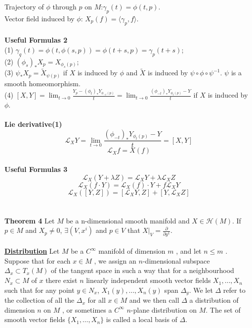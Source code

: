 \documentclass{article}
\begin{document}
Trajectory of $\phi$ through $p$ on $M$:$\gamma_p(t) = \phi(t,p)$.\\
Vector field induced by $\phi$: $X_p(f) = \langle \gamma_p , f \rangle$.\\ \\
\textbf{Useful Formulas 2}\\
(1) $\gamma_q(t) = \phi(t,\phi(s,p)) = \phi(t+s,p) = \gamma_p(t+s)$;\\
(2) $(\phi_s)_{*}X_p = X_{\phi_s(p)}$;\\
(3) $\psi_{*} X_p = \tilde{X}_{\psi(p)}$ if $X$ is induced by $\phi$ and $\tilde{X}$ is induced by $\psi \circ \phi \circ \psi^{-1} $. $\psi$ is a smooth  homeomorphism.\\
(4) $[X,Y] = \lim_{t \to 0} \frac{Y_p-(\phi_t)_* Y_{\phi_{-t}(p)}}{t} = \lim_{t \to 0} \frac{(\phi_{-t})_*Y_{\phi_t(p)}- Y}{t}$ if $X$ is induced by $\phi$.\\ \\
\textbf{Lie derivative(1)}\\
\[\mathcal{L}_{X}Y= \lim_{t \to 0} \frac{(\phi_{-t})_*Y_{\phi_t(p)}- Y}{t} =[X,Y]\]
\[\mathcal{L}_{X}f = X(f)\]\\
\textbf{Useful Formulas 3}\\
\[\mathcal{L}_{X}(Y + \lambda Z) = \mathcal{L}_{X}Y + \lambda\mathcal{L}_{X}Z\]
\[\mathcal{L}_{X}(f \cdot Y) = \mathcal{L}_{X}(f) \cdot Y + f\mathcal{L}_{X}Y\]
\[\mathcal{L}_{X}([Y,Z]) = [\mathcal{L}_{X}Y,Z]+ [Y,\mathcal{L}_{X}Z]\]\\ \\
\textbf{Theorem 4} Let $M$ be a n-dimensional smooth manifold and $X \in \mathcal{H}(M)$. If $p \in M$ and $X_p \neq 0$, $\exists (V,x^i)$ and $p \in V$ that $X|_V = \frac{\partial}{\partial y^1 }$.\\ \\
\href{https://en.wikipedia.org/wiki/Distribution_(differential_geometry)}{\textbf{Distribution}} Let $M$ be a $C^{\infty }$  manifold of dimension $m$ , and let $n \leq m$ . Suppose that for each $x\in M$ , we assign an $n$-dimensional subspace $\Delta _{x}\subset T_{x}(M)$ of the tangent space in such a way that for a neighbourhood $N_{x}\subset M$ of $x$ there exist $n$ linearly independent smooth vector fields $X_{1},\ldots ,X_{n}$ such that for any point $y\in N_{x}$, $X_{1}(y),\ldots ,X_{n}(y)$ span $\Delta _{y}$. We let $\Delta$  refer to the collection of all the $\Delta_{x}$ for all $ x\in M$ and we then call $\Delta$ a distribution of dimension $n$ on $M$ , or sometimes a $C^{\infty }$ $n$-plane distribution on $M$. The set of smooth vector fields $\{X_{1},\ldots ,X_{n}\}$ is called a local basis of $\Delta$.\\ \\
\end{document}
